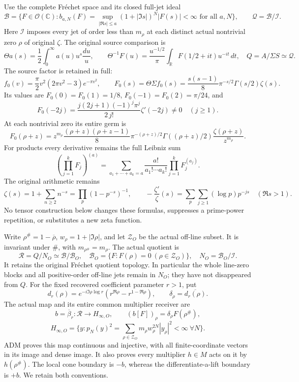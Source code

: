Use the complete Fréchet space and its closed full-jet ideal \[
\mathcal B=\{F\in\mathcal O(\mathbb C): b_{a,N}(F)=\sup_{|\Re s|\le a}(1+|\Im s|)^N|F(s)|<\infty\text{ for all }a,N\},
\qquad \mathcal Q=\mathcal B/\mathcal I.
\tag{TWC1.1}
\] Here \(\mathcal I\) imposes every jet of order less than \(m_\rho\)
at each distinct actual nontrivial zero \(\rho\) of original \(\zeta\).
The original source comparison is \[
\Theta a(s)=\frac12\int_0^\infty a(u)u^s\frac{du}{u},\qquad
\Theta^{-1}F(u)=\frac{u^{-1/2}}\pi\int_{\mathbb R}F(1/2+it)u^{-it}\,dt,
\quad Q=A/\Sigma S\simeq\mathcal Q.
\tag{TWC1.2}
\] The source factor is retained in full: \[
f_0(v)=\frac\pi2v^2(2\pi v^2-3)e^{-\pi v^2},\qquad
F_0(s)=\Theta\Sigma f_0(s)=\frac{s(s-1)}8\pi^{-s/2}\Gamma(s/2)\zeta(s).
\tag{TWC1.3}
\] Its values are \(F_0(0)=F_0(1)=1/8\), \(F_0(-1)=F_0(2)=\pi/24\), and
\[
F_0(-2j)=\frac{j(2j+1)(-1)^j\pi^j}{2\,j!}\zeta'(-2j)\ne0\quad(j\ge1).
\tag{TWC1.4}
\] At each nontrivial zero its entire germ is \[
F_0(\rho+z)=z^{m_\rho}\frac{(\rho+z)(\rho+z-1)}8
\pi^{-(\rho+z)/2}\Gamma((\rho+z)/2)
\frac{\zeta(\rho+z)}{z^{m_\rho}}.
\tag{TWC1.5}
\] For products every derivative remains the full Leibniz sum \[
\left(\prod_{j=1}^k F_j\right)^{(a)}
=\sum_{a_1+\cdots+a_k=a}\frac{a!}{a_1!\cdots a_k!}
\prod_{j=1}^kF_j^{(a_j)}.
\tag{TWC1.6}
\] The original arithmetic remains \[
\zeta(s)=1+\sum_{n\ge2}n^{-s}=\prod_p(1-p^{-s})^{-1},\qquad
-\frac{\zeta'}\zeta(s)=\sum_p\sum_{j\ge1}(\log p)p^{-js}\quad(\Re s>1).
\tag{TWC1.7}
\] No tensor construction below changes these formulas, suppresses a
prime-power repetition, or substitutes a new zeta function.

Write \(\rho^\#=1-\overline\rho\), \(w_\rho=1+|\Im\rho|\), and let
\(\mathscr Z_O\) be the actual off-line subset. It is invariant under
\(\#\), with \(m_{\rho^\#}=m_\rho\). The actual quotient is \[
\mathcal R=Q/N_O\simeq\mathcal B/\mathcal B_O,
\quad \mathcal B_O=\{F:F(\rho)=0\ (\rho\in\mathscr Z_O)\},
\quad N_O=\mathcal B_O/\mathcal I.
\tag{TWC1.8}
\] It retains the original Fréchet quotient topology. In particular the
whole line-zero blocks and all positive-order off-line jets remain in
\(N_O\); they have not disappeared from \(Q\). For the fixed recovered
coefficient parameter \(r>1\), put \[
d_r(\rho)=e^{-i\Im\rho\log r}(r^{\Re\rho}-r^{1-\Re\rho}),
\qquad \delta_\rho=\overline{d_r(\rho)}.
\tag{TWC1.9}
\] The actual map and its entire common multiplier receiver are \[
b=\overline\beta_r:\mathcal R\longrightarrow H_{\infty,O},\qquad
(b[F])_\rho=\delta_\rho F(\rho^\#),
\] \[
H_{\infty,O}=\{y:p_N(y)^2=\sum_{\rho\in\mathscr Z_O}m_\rho w_\rho^{2N}|y_\rho|^2<\infty\ \forall N\}.
\tag{TWC1.10}
\] ADM proves this map continuous and injective, with all
finite-coordinate vectors in its image and dense image. It also proves
every multiplier \(h\in M\) acts on it by \(h(\rho^\#)\). The local cone
boundary is \(-b\), whereas the differentiate-a-lift boundary is \(+b\).
We retain both conventions.

